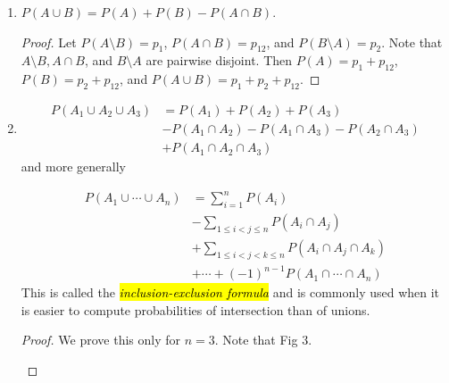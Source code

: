 \documentclass[12pt,a4paper]{article}
\theoremstyle{definition}
\theoremstyle{definition}
\theoremstyle{definition}
\theoremstyle{definition}
\theoremstyle{remark}
\theoremstyle{definition}
\begin{document}
\begin{enumerate}[(C1)]
	\item $P(A\cup B)=P(A)+P(B)-P(A\cap B)$.\begin{proof}
		Let $P(A\setminus B)=p_1$, $P(A\cap B)=p_{12}$, and $P(B\setminus A)=p_2$. Note that $A\setminus B, A\cap B$, and $B\setminus A$ are pairwise disjoint. Then $P(A)=p_1+p_{12}$, $P(B)=p_2+p_{12}$, and $P(A\cup B)=p_1+p_2+p_{12}$.
	\end{proof}
	\item \begin{align*}
	P(A_1\cup A_2\cup A_3)&=P(A_1)+P(A_2)+P(A_3)\\
	&-P(A_1\cap A_2)-P(A_1\cap A_3)-P(A_2\cap A_3)\\
	&+P(A_1\cap A_2\cap A_3)
	\end{align*} and more generally \begin{tcolorbox}[colback=white]
		\begin{align*}
		P(A_1\cup\cdots\cup A_n)&=\sum_{i=1}^nP(A_i)\\
		&-\sum_{1\leq i<j\leq n}P(A_i\cap A_j)\\
		&+\sum_{1\leq i<j<k\leq n}P(A_i\cap A_j\cap A_k)\\
		&+\cdots+(-1)^{n-1}P(A_1\cap\cdots\cap A_n)
		\end{align*} This is called the \hl{\textit{inclusion-exclusion formula}} and is commonly used when it is easier to compute probabilities of intersection than of unions.
	\end{tcolorbox}\begin{proof}
	We prove this only for $n=3$. Note that Fig 3.
	\begin{figure}[h!]
		\centering
		\begin{tikzpicture}[x=0.55pt,y=0.55pt,yscale=-1,xscale=1]
		

\end{tikzpicture}
\end{figure}
\end{proof}
\end{enumerate}
\end{document}
